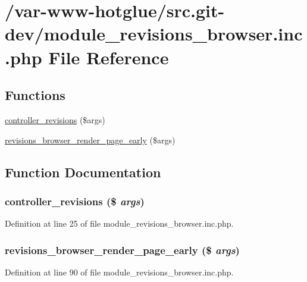\hypertarget{module__revisions__browser_8inc_8php}{
\section{/var-\/www-\/hotglue/src.git-\/dev/module\_\-revisions\_\-browser.inc.php File Reference}
\label{module__revisions__browser_8inc_8php}
}
\subsection*{Functions}
\begin{DoxyCompactItemize}
\item 
\hyperlink{module__revisions__browser_8inc_8php_a9eda010871ad706aca87cfd7b9dd0f7d}{controller\_\-revisions} (\$args)
\item 
\hyperlink{module__revisions__browser_8inc_8php_aeb482f35141c71dd933daeec9e9ce599}{revisions\_\-browser\_\-render\_\-page\_\-early} (\$args)
\end{DoxyCompactItemize}


\subsection{Function Documentation}
\hypertarget{module__revisions__browser_8inc_8php_a9eda010871ad706aca87cfd7b9dd0f7d}{
\subsubsection[{controller\_\-revisions}]{\setlength{\rightskip}{0pt plus 5cm}controller\_\-revisions (\$ {\em args})}}
\label{module__revisions__browser_8inc_8php_a9eda010871ad706aca87cfd7b9dd0f7d}


Definition at line 25 of file module\_\-revisions\_\-browser.inc.php.

\hypertarget{module__revisions__browser_8inc_8php_aeb482f35141c71dd933daeec9e9ce599}{
\subsubsection[{revisions\_\-browser\_\-render\_\-page\_\-early}]{\setlength{\rightskip}{0pt plus 5cm}revisions\_\-browser\_\-render\_\-page\_\-early (\$ {\em args})}}
\label{module__revisions__browser_8inc_8php_aeb482f35141c71dd933daeec9e9ce599}


Definition at line 90 of file module\_\-revisions\_\-browser.inc.php.

